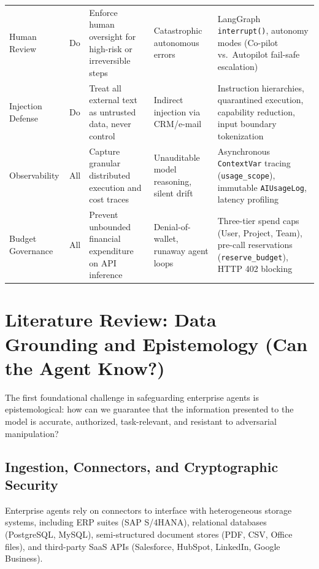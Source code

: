 \documentclass[10pt,a4paper,twocolumn]{article}
\begin{document}
\begin{table}[t]
\begin{tabularx}{\textwidth}{@{}p{2.6cm} p{1.3cm} Y Y Y@{}}
Human Review & Do & Enforce human oversight for high-risk or irreversible steps & Catastrophic autonomous errors & LangGraph \texttt{interrupt()}, autonomy modes (Co-pilot vs.\ Autopilot fail-safe escalation) \\
Injection Defense & Do & Treat all external text as untrusted data, never control & Indirect injection via CRM/e-mail & Instruction hierarchies, quarantined execution, capability reduction, input boundary tokenization \\
Observability & All & Capture granular distributed execution and cost traces & Unauditable model reasoning, silent drift & Asynchronous \texttt{ContextVar} tracing (\texttt{usage\_scope}), immutable \texttt{AIUsageLog}, latency profiling \\
Budget Governance & All & Prevent unbounded financial expenditure on API inference & Denial-of-wallet, runaway agent loops & Three-tier spend caps (User, Project, Team), pre-call reservations (\texttt{reserve\_budget}), HTTP 402 blocking \\
\bottomrule
\end{tabularx}
\end{table}

\section{Literature Review: Data Grounding and Epistemology (Can the Agent Know?)}
\label{sec:know}

The first foundational challenge in safeguarding enterprise agents is epistemological: how can we guarantee that the information presented to the model is accurate, authorized, task-relevant, and resistant to adversarial manipulation?

\subsection{Ingestion, Connectors, and Cryptographic Security}
Enterprise agents rely on connectors to interface with heterogeneous storage systems, including ERP suites (SAP S/4HANA), relational databases (PostgreSQL, MySQL), semi-structured document stores (PDF, CSV, Office files), and third-party SaaS APIs (Salesforce, HubSpot, LinkedIn, Google Business). 
\end{document}
